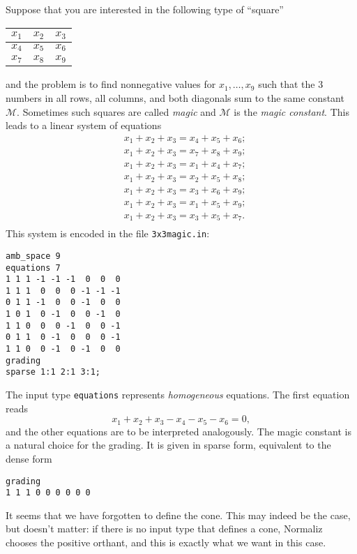 \documentclass[12pt,a4paper]{scrartcl}
\theoremstyle{definition}
\def\ttt{\texttt}
\begin{document}
Suppose that you are interested in the following type of ``square''
\begin{center}
	\begin{tabular}{|l|l|l|}
		\hline
		$x_1$ & $x_2$ & $x_3$\\
		\hline
		$x_4$ & $x_5$ & $x_6$\\
		\hline
		$x_7$ & $x_8$ & $x_9$\\
		\hline
	\end{tabular}
\end{center}
and the problem is to find nonnegative values for $x_1,\dots,x_9$
such that the 3 numbers in all rows, all columns, and both
diagonals sum to the same constant $\mathcal{M}$. Sometimes
such squares are called \emph{magic} and $\mathcal M$ is the
\emph{magic constant}. This leads to a linear system of
equations
\begin{align*}
	& x_1+x_2+x_3=x_4+x_5+x_6;\\
	& x_1+x_2+x_3=x_7+x_8+x_9;\\
	& x_1+x_2+x_3=x_1+x_4+x_7;\\
	& x_1+x_2+x_3=x_2+x_5+x_8;\\
	& x_1+x_2+x_3=x_3+x_6+x_9;\\
	& x_1+x_2+x_3=x_1+x_5+x_9;\\
	& x_1+x_2+x_3=x_3+x_5+x_7.\\
\end{align*}
This system is encoded in the file
\ttt{3x3magic.in}:
\begin{Verbatim}
amb_space 9
equations 7
1 1 1 -1 -1 -1  0  0  0
1 1 1  0  0  0 -1 -1 -1
0 1 1 -1  0  0 -1  0  0
1 0 1  0 -1  0  0 -1  0
1 1 0  0  0 -1  0  0 -1
0 1 1  0 -1  0  0  0 -1
1 1 0  0 -1  0 -1  0  0
grading
sparse 1:1 2:1 3:1;
\end{Verbatim}

The input type \verb|equations| represents \emph{homogeneous} equations. The first equation reads
$$
x_1+x_2+x_3-x_4-x_5-x_6=0,
$$
and the other equations are to be interpreted analogously. The magic constant is a natural choice for the grading. It is given in sparse form, equivalent to the dense form
\begin{Verbatim}
grading
1 1 1 0 0 0 0 0 0
\end{Verbatim}

It seems that we have forgotten to define the cone. This may indeed be the case, but doesn't matter: if there is no input type that defines a cone, Normaliz chooses the positive orthant, and this is exactly what we want in this case.
\end{document}
